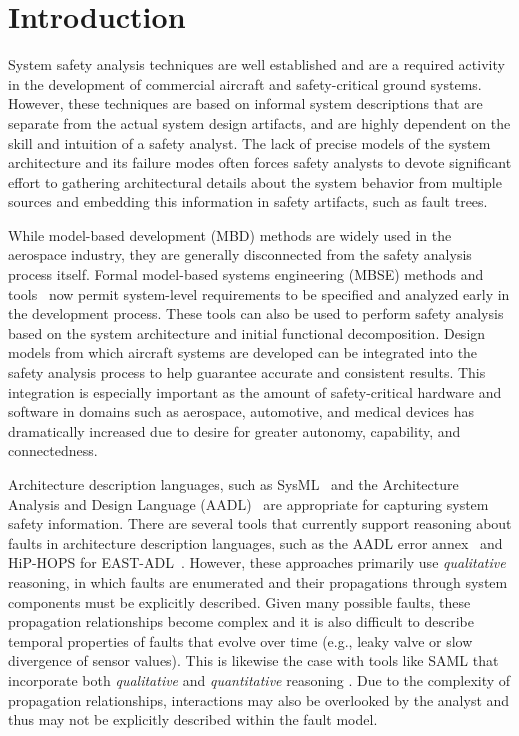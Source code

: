 \section{Introduction}

System safety analysis techniques are well established and are a required activity in the development of commercial aircraft and safety-critical ground systems. However, these techniques are based on informal system descriptions that are separate from the actual system design artifacts, and are highly dependent on the skill and intuition of a safety analyst. The lack of precise models of the system architecture and its failure modes often forces safety analysts to devote significant effort to gathering architectural details about the system behavior from multiple sources and embedding this information in safety artifacts, such as fault trees.

While model-based development (MBD) methods are widely used in the aerospace industry, they are generally disconnected from the safety analysis process itself. Formal model-based systems engineering (MBSE) methods and tools~\cite{QFCS15:backes,hilt2013,NFM2012:CoGaMiWhLaLu,DBLP:journals/scp/CimattiT15,Pajic2012,DBLP:conf/adaEurope/SokolskyLC09} now permit system-level requirements to be specified and analyzed early in the development process. These tools can also be used to perform safety analysis based on the system architecture and initial functional decomposition. Design models from which aircraft systems are developed can be integrated into the safety analysis process to help guarantee accurate and consistent results. This integration is especially important as the amount of safety-critical hardware and software in domains such as aerospace, automotive, and medical devices has dramatically increased due to desire for greater autonomy, capability, and connectedness.

Architecture description languages, such as SysML~\cite{SysML} and the Architecture Analysis and Design Language (AADL)~\cite{AADL} are appropriate for capturing system safety information.  There are several tools that currently support reasoning about faults in architecture description languages, such as the AADL error annex~\cite{Larson:2013:IAE:2527269.2527271} and HiP-HOPS for EAST-ADL~\cite{CHEN201391}.  However, these approaches primarily use {\em qualitative} reasoning, in which faults are enumerated and their propagations through system components must be explicitly described.  Given many possible faults, these propagation relationships become complex and it is also difficult to describe temporal properties of faults that evolve over time (e.g., leaky valve or slow divergence of sensor values). This is likewise the case with tools like SAML that incorporate both \textit{qualitative} and \textit{quantitative} reasoning \cite{Gudemann:2010:FQQ:1909626.1909813}. Due to the complexity of propagation relationships, interactions may also be overlooked by the analyst and thus may not be explicitly described within the fault model. 



